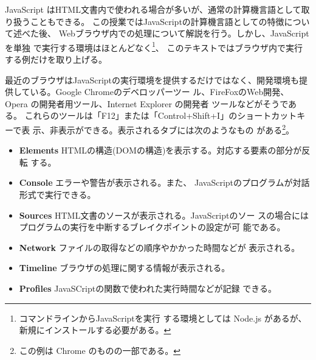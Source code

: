 JavaScript はHTML文書内で使われる場合が多いが、通常の計算機言語として取
り扱うこともできる。
この授業ではJavaScriptの計算機言語としての特徴について述べた後、
Webブラウザ内での処理について解説を行う。しかし、JavaScriptを単独
で実行する環境はほとんどなく\footnote{コマンドラインからJavaScriptを実行
する環境としては Node.js があるが、新規にインストールする必要がある。}、
このテキストではブラウザ内で実行する例だけを取り上げる。

最近のブラウザはJavaScriptの実行環境を提供するだけではなく、開発環境も提
供している。Google Chromeのデベロッパーツー
ル、FireFoxのWeb開発、Opera の開発者用ツール、Internet Explorer の開発者
ツールなどがそうである。
これらのツールは「F12」または「Control+Shift+I」のショートカットキーで表
示、非表示ができる。表示されるタブには次のようなもの
がある\footnote{この例は Chrome のものの一部である。}。
\begin{itemize}
 \item {\bfseries Elements }
       HTMLの構造(DOMの構造)を表示する。対応する要素の部分が反転
       する。
 \item {\bfseries Console }エラーや警告が表示される。また、
       JavaScriptのプログラムが対話形式で実行できる。
 \item {\bfseries Sources }HTML文書のソースが表示される。JavaScriptのソー
       スの場合にはプログラムの実行を中断するブレイクポイントの設定が可
       能である。
 \item {\bfseries Network }ファイルの取得などの順序やかかった時間などが
       表示される。
 \item {\bfseries Timeline }ブラウザの処理に関する情報が表示される。
 \item {\bfseries Profiles }JavaSCriptの関数で使われた実行時間などが記録
       できる。
\end{itemize}